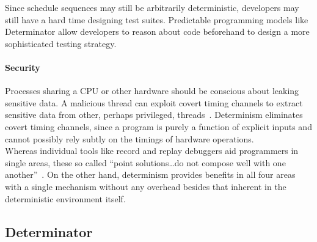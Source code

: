 Since schedule sequences may still be arbitrarily deterministic, developers may
still have a hard time designing test suites. Predictable programming models
like Determinator allow developers to reason about code beforehand
to design a more sophisticated testing strategy.

\paragraph{Security} Processes sharing a CPU or other hardware should be
conscious about leaking sensitive data. A malicious thread can exploit covert
timing channels to extract sensitive data from other, perhaps privileged,
threads~\cite{Aviram10cloud}. Determinism eliminates covert timing channels,
since a program is purely a function of explicit inputs and cannot possibly rely
subtly on the timings of hardware operations.
\\

\iffalse
We also note the importance of repeatability in simulators.
Physicists rely on repeatability of simulated experiments to verify results,
and video game developers often benefit from repeatable physics engines.
\fi

Whereas individual tools like record and replay debuggers aid programmers in
single areas, these so called ``point solutions\ldots do not compose well with
one another''~\cite{Bergan11}. On the other hand, determinism provides benefits
in all four areas with a single mechanism without any overhead besides that
inherent in the deterministic environment itself.

\iffalse
To further motivate determinism, we consider ``point solutions'' that
solve problems in single areas at
once. Record and replay debuggers, like Leblanc et al.'s Instant Replay
system, aid in debugging parallel programs by logging scheduling sequences and
other relevant interactions in order to replay an execution sequence exactly.
However, these debuggers are costly in terms of storage and performance.
\iffalse Even with replay ability, the execution sequence is still arbitrary and
gives the programmer no intuition about the program's behavior. \fi
In general, these ``point solutions\ldots do not compose well with one
another''~\cite{Bergan11}. On the other hand, determinism provides benefits in
all four areas at once with a single mechanism without any additional overhead
besides that inherent in the deterministic environment.
\fi

\subsection{Determinator}
\label{sec:four-nondet}

